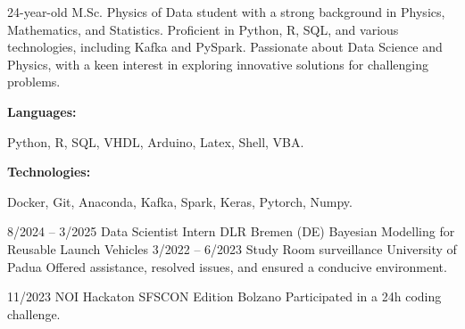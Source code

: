 \documentclass[9pt]{developercv} %
\begin{document}
\begin{minipage}[t]{0.46\textwidth}
	\vspace{-6pt}
 
	24-year-old M.Sc. Physics of Data student with a strong background in Physics, Mathematics, and Statistics. Proficient in Python, R, SQL, and various technologies, including Kafka and PySpark. Passionate about Data Science and Physics, with a keen interest in exploring innovative solutions for challenging problems.\\
 
\end{minipage}
\hfill %
\begin{minipage}[t]{0.465\textwidth}
    \vspace{-6pt}
    
    \begin{minipage}[t]{0.2\textwidth}
        \textbf{Languages:}
    \end{minipage}
    \hfill
    \begin{minipage}[t]{0.73\textwidth}
      Python, R, SQL, VHDL, Arduino, Latex, Shell, VBA.  
    \end{minipage}
    \vspace{4mm}
    
    \begin{minipage}[t]{0.2\textwidth}
        \textbf{Technologies:}
    \end{minipage}
    \hfill
    \begin{minipage}[t]{0.73\textwidth}
      Docker, Git, Anaconda, Kafka, Spark, Keras, Pytorch, Numpy.
    \end{minipage}
    
\end{minipage}


\vspace{-10 pt}
\begin{entrylist}
	\entry
        {8/2024 -- 3/2025}
		{Data Scientist Intern}
		{DLR Bremen (DE)}
            {Bayesian Modelling for Reusable Launch Vehicles}
	\entry
        {3/2022 -- 6/2023}
		{Study Room surveillance}
		{University of Padua}
            {Offered assistance, resolved issues, and ensured a conducive environment.}
		
	\entry
		{11/2023}
		{NOI Hackaton SFSCON Edition}
		{Bolzano}
		{Participated in a 24h coding challenge.}
	
\end{entrylist}
\end{document}
